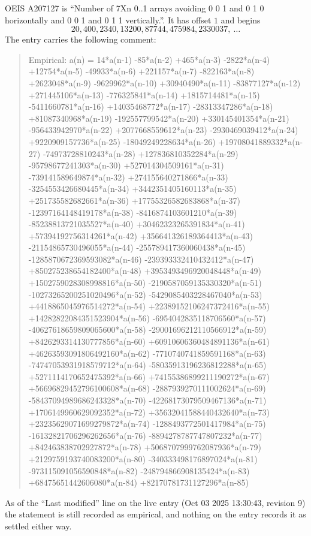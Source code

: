 \documentclass[11pt,a4paper]{article}
\theoremstyle{plain}
\theoremstyle{definition}
\begin{document}
OEIS A207127 is ``Number of 7Xn 0..1 arrays avoiding 0 0 1 and 0 1 0 horizontally and 0 0 1 and 0 1 1 vertically.''. It has offset
$1$ and begins
\[
20, 400, 2340, 13200, 87744, 475984, 2330037,\ \dots
\]
The entry carries the following comment:
\begin{quote}\small
Empirical: a(n) = 14*a(n-1) -85*a(n-2) +465*a(n-3) -2822*a(n-4) +12754*a(n-5) -49933*a(n-6) +221157*a(n-7) -822163*a(n-8) +2623048*a(n-9) -9629962*a(n-10) +30940490*a(n-11) -83877127*a(n-12) +271445106*a(n-13) -776325841*a(n-14) +1815714481*a(n-15) -5411660781*a(n-16) +14035468772*a(n-17) -28313347286*a(n-18) +81087340968*a(n-19) -192557799542*a(n-20) +330145401354*a(n-21) -956433942970*a(n-22) +2077668559612*a(n-23) -2930469039412*a(n-24) +9220909157736*a(n-25) -18049249228634*a(n-26) +19708041889332*a(n-27) -74973728810243*a(n-28) +127836810352284*a(n-29) -95798677241303*a(n-30) +527014304509161*a(n-31) -739141589649874*a(n-32) +274155640271866*a(n-33) -3254553426680445*a(n-34) +3442351405160113*a(n-35) +251735582682661*a(n-36) +17755326582683868*a(n-37) -12397164148419178*a(n-38) -8416874103601210*a(n-39) -85238813721035527*a(n-40) +30462323265391834*a(n-41) +57394192756314261*a(n-42) +356641326189364413*a(n-43) -21154865730496055*a(n-44) -255789417360060438*a(n-45) -1285870672369593082*a(n-46) -239393332410432412*a(n-47) +850275238654182400*a(n-48) +3953493496920048448*a(n-49) +1502759028308998816*a(n-50) -2190587059135330320*a(n-51) -10273265200251020496*a(n-52) -5429085403228467040*a(n-53) +4418865045976514272*a(n-54) +22389152106247372416*a(n-55) +14282822084351523904*a(n-56) -6954042835118706560*a(n-57) -40627618659809065600*a(n-58) -29001696212110566912*a(n-59) +8426293314130777856*a(n-60) +60910606360484891136*a(n-61) +46263593091806492160*a(n-62) -7710740741859591168*a(n-63) -74747053931918579712*a(n-64) -58035913196236812288*a(n-65) +5271114170652475392*a(n-66) +74155386899211190272*a(n-67) +56696829452796100608*a(n-68) -2887939270111002624*a(n-69) -58437094989686243328*a(n-70) -42268173079509467136*a(n-71) +1706149960629092352*a(n-72) +35632041588440432640*a(n-73) +23235629071699279872*a(n-74) -1288493772501417984*a(n-75) -16132821706296262656*a(n-76) -8894278787747807232*a(n-77) +842463838702927872*a(n-78) +5068707999762087936*a(n-79) +2129759193740083200*a(n-80) -340333498176897024*a(n-81) -973115091056590848*a(n-82) -248794866908135424*a(n-83) +68475651442606080*a(n-84) +82170781731127296*a(n-85)
\end{quote}
As of the ``Last modified'' line on the live entry (Oct 03 2025 13:30:43, revision
9) the statement is still recorded as empirical, and nothing on the entry
records it as settled either way.
\end{document}
